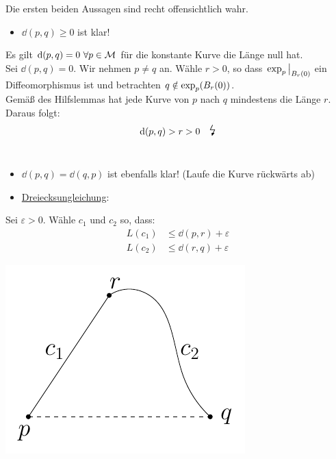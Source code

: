 \begin{bew}
Die ersten beiden Aussagen sind recht offensichtlich wahr.
\begin{itemize}
\item $\dd(p, q) \geq 0$ ist klar! 
\end{itemize}
\vspace{.1cm}
Es gilt $\dd(p, q)=0 \ \forall p \in \mathcal{M}$ für die konstante Kurve die Länge null hat. \\
Sei $\dd(p, q)=0$. Wir nehmen $p\neq q$ an. Wähle $r>0$, so dass $\eval{\expp_p}_{B_r(0)}$ ein Diffeomorphismus ist und betrachten $q \notin \operatorname{exp}_p(B_r(0))$. \\
Gemäß des Hilfslemmas hat jede Kurve von $p$ nach $q$ mindestens die Länge $r$. \\
Daraus folgt: 
\begin{align*}
\dd(p, q) > r > 0 \quad\text{\Large{\lightning}}
\end{align*}\
\begin{itemize}
\item $\dd(p, q) = \dd(q, p)$ ist ebenfalls klar! (Laufe die Kurve rückwärts ab)
\item \underline{Dreiecksungleichung}: 
\end{itemize}


\begin{minipage}[H]{0.99\textwidth}
Sei $\varepsilon>0$. Wähle $c_1$ und $c_2$ so, dass:
\begin{align*}
L(c_1) &\leq \dd(p, r) + \varepsilon \\
L(c_2) &\leq \dd(r, q) + \varepsilon
\end{align*}
\end{minipage}
\hspace{-3cm}
\begin{minipage}[H]{.3\textwidth}
\vspace{-1.7cm}
\includegraphics[scale=0.7]{figures/tikz/dreiecksungleichung}
\end{minipage} \\


\end{bew}
